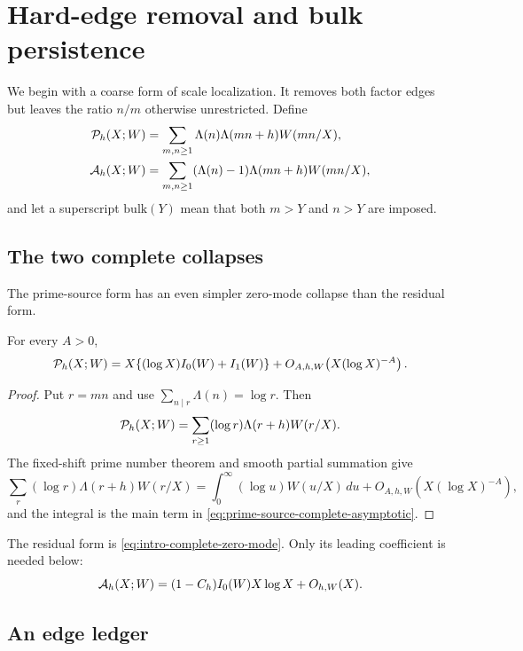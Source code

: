 \section{Hard-edge removal and bulk persistence}
\label{sec:scale-bulk}

We begin with a coarse form of scale localization.  It removes both factor
edges but leaves the ratio $n/m$ otherwise unrestricted.  Define
\begin{align}
 \mathcal P_h(X;W)
 &=\sum_{m,n\geq1}\Lambda(n)\Lambda(mn+h)W(mn/X),
 \label{eq:prime-source-complete}\\
 \mathcal A_h(X;W)
 &=\sum_{m,n\geq1}(\Lambda(n)-1)\Lambda(mn+h)W(mn/X),
 \label{eq:residual-complete}
\end{align}
and let a superscript $\mathrm{bulk}(Y)$ mean that both $m>Y$ and $n>Y$
are imposed.

\subsection{The two complete collapses}

The prime-source form has an even simpler zero-mode collapse than the
residual form.

\begin{proposition}
\label{prop:prime-source-collapse}
For every $A>0$,
\begin{equation}\label{eq:prime-source-complete-asymptotic}
 \mathcal P_h(X;W)
 =X\{(\log X)I_0(W)+I_1(W)\}
 +O_{A,h,W}\!\left(X(\log X)^{-A}\right).
\end{equation}
\end{proposition}

\begin{proof}
Put $r=mn$ and use $\sum_{n\mid r}\Lambda(n)=\log r$.  Then
\[
 \mathcal P_h(X;W)=\sum_{r\geq1}(\log r)\Lambda(r+h)W(r/X).
\]
The fixed-shift prime number theorem and smooth partial summation give
\[
 \sum_r(\log r)\Lambda(r+h)W(r/X)
 =\int_0^\infty (\log u)W(u/X)\,du
 +O_{A,h,W}(X(\log X)^{-A}),
\]
and the integral is the main term in
\eqref{eq:prime-source-complete-asymptotic}.
\end{proof}

The residual form is \eqref{eq:intro-complete-zero-mode}.  Only its leading
coefficient is needed below:
\begin{equation}\label{eq:residual-leading-only}
 \mathcal A_h(X;W)
 =(1-C_h)I_0(W)X\log X+O_{h,W}(X).
\end{equation}

\subsection{An edge ledger}

